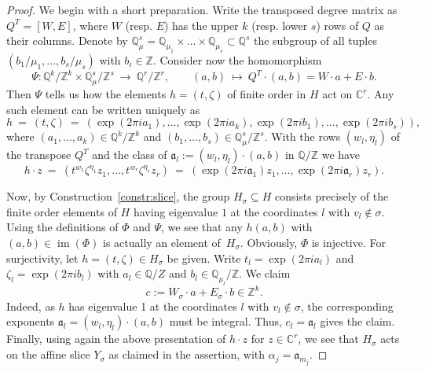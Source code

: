 \documentclass{amsart}
\newcommand{\C}{\mathbb{C}}
\newcommand{\Q}{\mathbb{Q}}
\newcommand{\Z}{\mathbb{Z}}
\DeclareMathOperator{\im}{im}
\theoremstyle{plain}
\theoremstyle{definition}
\begin{document}
\begin{proof}
We begin with a short preparation.
Write the transposed degree matrix as $Q^T= [W,E]$, where $W$
(resp. $E$) has the upper $k$ (resp. lower $s$) rows of $Q$ as
their columns. Denote by $\Q_\mu^s=\Q_{\mu_1}\times\dots\times\Q_{\mu_s}\subset\Q^s$ the subgroup of all tuples $(b_1/\mu_1,\dots,b_s/\mu_s)$ with $b_i\in\Z$. Consider now the homomorphism 
$$
\Psi \colon
\Q^k/\Z^k \times \Q_\mu^s/\Z^s \ \to \ \Q^r/\Z^r,
\qquad
(a,b) \ \mapsto \ Q^T \cdot (a, b) =  W \cdot a + E \cdot b.
$$  
Then $\Psi$ tells us how the elements $h = (t,\zeta)$ of
finite order in $H$ act on $\C^r$.
Any such element can be written uniquely as 
$$
h
\ = \
(t,\zeta)
\ = \
\left(
\exp(2 \pi i a_1), \ldots, \exp(2 \pi i a_k),
\exp(2 \pi i b_1), \ldots, \exp(2 \pi i b_s)
\right),
$$
where $(a_1,\ldots, a_k) \in \Q^k/\Z^k$ and $(b_1,\ldots, b_s) \in \Q_\mu^s/\Z^s$.
With the rows $(w_l,\eta_l)$ of the transpose $Q^T$ and the class of
$\mathfrak{a}_l := (w_l,\eta_l) \cdot (a,b)$ in $\Q/\Z$ we have
$$
h \cdot z
\ = \
(t^{w_1}\zeta^{\eta_1}z_1, \ldots, t^{w_r}\zeta^{\eta_r}z_r)
\ = \
\left(\exp(2 \pi i\mathfrak{a}_1)z_1, \ldots, \exp(2 \pi i \mathfrak{a}_r)z_r \right).
$$

Now, by Construction~\ref{constr:slice}, the group $H_\sigma \subseteq H$
consists precisely of the finite order elements of $H$ having eigenvalue
$1$ at the coordinates $l$ with $v_l \not \in \sigma$.
Using the definitions of $\Phi$ and $\Psi$, we see that any $h(a,b)$ with $(a,b)\in\im(\Phi)$
is actually an element of~$H_\sigma$.
Obviously, $\Phi$ is injective.
For surjectivity, let $h = (t,\zeta) \in H_\sigma$ be given.
Write $t_l=\exp(2\pi i a_l)$ and  $\zeta_l=\exp(2\pi i b_l)$
with $a_l \in \Q/Z$ and $b_l \in \Q_{\mu_l}/\Z$.
We claim
$$
c := W_\sigma \cdot a + E_\sigma \cdot b \in \Z^k.
$$
Indeed, as $h$ has eigenvalue 1 at the coordinates $l$
with $v_l \not \in \sigma$, the corresponding exponents
$\mathfrak{a}_l = (w_l,\eta_l) \cdot (a,b)$ must be integral.
Thus,  $c_l=\mathfrak{a}_l$ gives the claim.
Finally, using again the above presentation of $h \cdot z$ for
$z \in \C^r$, we see that $H_\sigma$ acts on the affine slice
$Y_\sigma$ as claimed in the assertion, with $\alpha_j=\mathfrak{a}_{m_j}$.
\end{proof}
\end{document}
